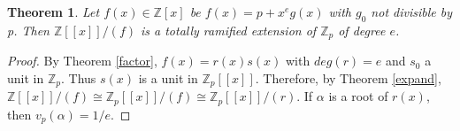 \documentclass{article}
\newtheorem{theorem}{Theorem}
\begin{document}
\begin{theorem}
Let $f(x) \in \mathbb{Z}[x]$ be $f(x) = p + x^e g(x)$ with $g_0$ not divisible by p.  Then $\mathbb{Z}[[x]]/(f)$ is a totally ramified extension of $\mathbb{Z}_p$ of degree $e$.
\end{theorem}

\begin{proof}
By Theorem \ref{factor}, $f(x) = r(x)s(x)$ with $deg(r) = e$ and $s_0$ a unit in $\mathbb{Z}_p$.  Thus $s(x)$ is a unit in $\mathbb{Z}_p[[x]]$.  Therefore, by Theorem \ref{expand}, $\mathbb{Z}[[x]]/(f) \cong \mathbb{Z}_p[[x]]/(f) \cong \mathbb{Z}_p[[x]]/(r)$.  If $\alpha$ is a root of $r(x)$, then $v_p(\alpha) = 1/e$.

\end{proof}



\end{document}

